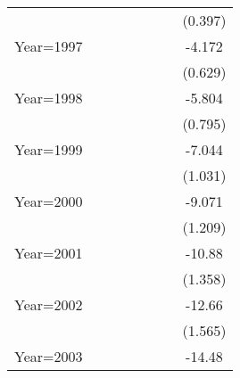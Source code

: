 \begin{table}[htbp]
\begin{tabular}{l*{7}{c}}
                &                  &                  &                  &                  &                  &                  &  (0.397)         \\
Year=1997       &                  &                  &                  &                  &                  &                  &   -4.172\sym{***}\\
                &                  &                  &                  &                  &                  &                  &  (0.629)         \\
Year=1998       &                  &                  &                  &                  &                  &                  &   -5.804\sym{***}\\
                &                  &                  &                  &                  &                  &                  &  (0.795)         \\
Year=1999       &                  &                  &                  &                  &                  &                  &   -7.044\sym{***}\\
                &                  &                  &                  &                  &                  &                  &  (1.031)         \\
Year=2000       &                  &                  &                  &                  &                  &                  &   -9.071\sym{***}\\
                &                  &                  &                  &                  &                  &                  &  (1.209)         \\
Year=2001       &                  &                  &                  &                  &                  &                  &   -10.88\sym{***}\\
                &                  &                  &                  &                  &                  &                  &  (1.358)         \\
Year=2002       &                  &                  &                  &                  &                  &                  &   -12.66\sym{***}\\
                &                  &                  &                  &                  &                  &                  &  (1.565)         \\
Year=2003       &                  &                  &                  &                  &                  &                  &   -14.48\sym{***}\\

\end{tabular}
\end{table}
